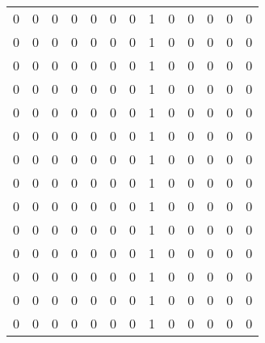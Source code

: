 \begin{tabular}{rrrrrrrrrrrrr}
       0 &       0 &          0 &               0 &                0 &       0 &          0 &          1 &         0 &         0 &      0 &             0 &         0 \\
       0 &       0 &          0 &               0 &                0 &       0 &          0 &          1 &         0 &         0 &      0 &             0 &         0 \\
       0 &       0 &          0 &               0 &                0 &       0 &          0 &          1 &         0 &         0 &      0 &             0 &         0 \\
       0 &       0 &          0 &               0 &                0 &       0 &          0 &          1 &         0 &         0 &      0 &             0 &         0 \\
       0 &       0 &          0 &               0 &                0 &       0 &          0 &          1 &         0 &         0 &      0 &             0 &         0 \\
       0 &       0 &          0 &               0 &                0 &       0 &          0 &          1 &         0 &         0 &      0 &             0 &         0 \\
       0 &       0 &          0 &               0 &                0 &       0 &          0 &          1 &         0 &         0 &      0 &             0 &         0 \\
       0 &       0 &          0 &               0 &                0 &       0 &          0 &          1 &         0 &         0 &      0 &             0 &         0 \\
       0 &       0 &          0 &               0 &                0 &       0 &          0 &          1 &         0 &         0 &      0 &             0 &         0 \\
       0 &       0 &          0 &               0 &                0 &       0 &          0 &          1 &         0 &         0 &      0 &             0 &         0 \\
       0 &       0 &          0 &               0 &                0 &       0 &          0 &          1 &         0 &         0 &      0 &             0 &         0 \\
       0 &       0 &          0 &               0 &                0 &       0 &          0 &          1 &         0 &         0 &      0 &             0 &         0 \\
       0 &       0 &          0 &               0 &                0 &       0 &          0 &          1 &         0 &         0 &      0 &             0 &         0 \\
       0 &       0 &          0 &               0 &                0 &       0 &          0 &          1 &         0 &         0 &      0 &             0 &         0 \\
\bottomrule
\end{tabular}
